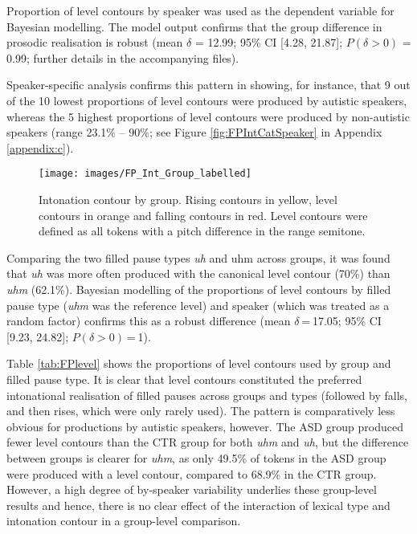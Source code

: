 Proportion of level contours by speaker was used as the dependent variable for Bayesian modelling. The model output confirms that the group difference in prosodic realisation is robust (mean \(\delta\) = 12.99; 95\% CI {[}4.28, 21.87{]}; \(P(\delta > 0)\) = 0.99; further details in the accompanying files).

Speaker-specific analysis confirms this pattern in showing, for instance, that 9 out of the 10 lowest proportions of level contours were produced by autistic speakers, whereas the 5 highest proportions of level contours were produced by non-autistic speakers (range 23.1\% -- 90\%; see Figure \ref{fig:FPIntCatSpeaker} in Appendix \ref{appendix:c}).



\begin{figure}

\texttt{[image: images/FP\_Int\_Group\_labelled]} \hfill{}

\caption{Intonation contour by group. Rising contours in yellow, level contours in orange and falling contours in red. Level contours were defined as all tokens with a pitch difference in the range  semitone.}\label{fig:FPIntCatGroupPic}
\end{figure}

Comparing the two filled pause types \emph{uh} and {uhm} across groups, it was found that \emph{uh} was more often produced with the canonical level contour (70\%) than  \emph{uhm} (62.1\%). Bayesian modelling of the proportions of level contours by filled pause type (\emph{uhm} was the reference level) and speaker (which was treated as a random factor) confirms this as a robust difference (mean \(\delta\) = 17.05; 95\% CI {[}9.23, 24.82{]}; \(P(\delta > 0)\) = 1).

Table \ref{tab:FPlevel} shows the proportions of level contours used by group and filled pause type. It is clear that level contours constituted the preferred intonational realisation of filled pauses across groups and types (followed by falls, and then rises, which were only rarely used). The pattern is comparatively less obvious for productions by autistic speakers, however. The ASD group produced fewer level contours than the CTR group for both \emph{uhm} and \emph{uh}, but the difference between groups is clearer for \emph{uhm}, as only 49.5\% of tokens in the ASD group were produced with a level contour, compared to 68.9\% in the CTR group. However, a high degree of by-speaker variability underlies these group-level results and hence, there is no clear effect of the interaction of lexical type and intonation contour in a group-level comparison.

